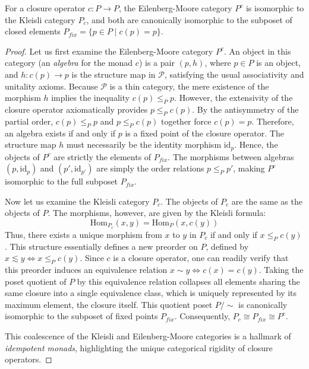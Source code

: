 \begin{theorem}
For a closure operator $c: P \to P$, the Eilenberg-Moore category $P^c$ is isomorphic to the Kleisli category $P_c$, and both are canonically isomorphic to the subposet of closed elements $P_{fix} = \{ p \in P \mid c(p) = p \}$.
\end{theorem}
\begin{proof}
Let us first examine the Eilenberg-Moore category $P^c$. An object in this category (an \emph{algebra} for the monad $c$) is a pair $(p, h)$, where $p \in P$ is an object, and $h: c(p) \to p$ is the structure map in $\mathcal{P}$, satisfying the usual associativity and unitality axioms.
Because $\mathcal{P}$ is a thin category, the mere existence of the morphism $h$ implies the inequality $c(p) \leq_P p$. However, the extensivity of the closure operator axiomatically provides $p \leq_P c(p)$. By the antisymmetry of the partial order, $c(p) \leq_P p$ and $p \leq_P c(p)$ together force $c(p) = p$.
Therefore, an algebra exists if and only if $p$ is a fixed point of the closure operator. The structure map $h$ must necessarily be the identity morphism $\text{id}_p$. Hence, the objects of $P^c$ are strictly the elements of $P_{fix}$. The morphisms between algebras $(p, \text{id}_p)$ and $(p', \text{id}_{p'})$ are simply the order relations $p \leq_P p'$, making $P^c$ isomorphic to the full subposet $P_{fix}$.

Now let us examine the Kleisli category $P_c$. The objects of $P_c$ are the same as the objects of $P$. The morphisms, however, are given by the Kleisli formula:
\[ \text{Hom}_{P_c}(x, y) = \text{Hom}_P(x, c(y)) \]
Thus, there exists a unique morphism from $x$ to $y$ in $P_c$ if and only if $x \leq_P c(y)$. This structure essentially defines a new preorder on $P$, defined by $x \lesssim y \iff x \leq_P c(y)$.
Since $c$ is a closure operator, one can readily verify that this preorder induces an equivalence relation $x \sim y \iff c(x) = c(y)$. Taking the poset quotient of $P$ by this equivalence relation collapses all elements sharing the same closure into a single equivalence class, which is uniquely represented by its maximum element, the closure itself. This quotient poset $P/\sim$ is canonically isomorphic to the subposet of fixed points $P_{fix}$. Consequently, $P_c \cong P_{fix} \cong P^c$.

This coalescence of the Kleisli and Eilenberg-Moore categories is a hallmark of \emph{idempotent monads}, highlighting the unique categorical rigidity of closure operators.
\end{proof}

